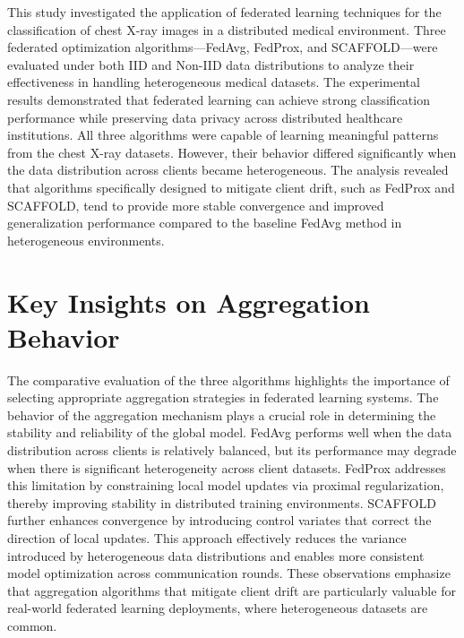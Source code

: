 \documentclass[12pt]{book}
\begin{document}
This study investigated the application of federated learning techniques for the classification of chest X-ray images in a distributed medical environment. Three federated optimization algorithms—FedAvg, FedProx, and SCAFFOLD—were evaluated under both IID and Non-IID data distributions to analyze their effectiveness in handling heterogeneous medical datasets.
The experimental results demonstrated that federated learning can achieve strong classification performance while preserving data privacy across distributed healthcare institutions. All three algorithms were capable of learning meaningful patterns from the chest X-ray datasets. However, their behavior differed significantly when the data distribution across clients became heterogeneous.
The analysis revealed that algorithms specifically designed to mitigate client drift, such as FedProx and SCAFFOLD, tend to provide more stable convergence and improved generalization performance compared to the baseline FedAvg method in heterogeneous environments.

\section{Key Insights on Aggregation Behavior}

The comparative evaluation of the three algorithms highlights the importance of selecting appropriate aggregation strategies in federated learning systems. The behavior of the aggregation mechanism plays a crucial role in determining the stability and reliability of the global model.
FedAvg performs well when the data distribution across clients is relatively balanced, but its performance may degrade when there is significant heterogeneity across client datasets. FedProx addresses this limitation by constraining local model updates via proximal regularization, thereby improving stability in distributed training environments.
SCAFFOLD further enhances convergence by introducing control variates that correct the direction of local updates. This approach effectively reduces the variance introduced by heterogeneous data distributions and enables more consistent model optimization across communication rounds.
These observations emphasize that aggregation algorithms that mitigate client drift are particularly valuable for real-world federated learning deployments, where heterogeneous datasets are common.
\end{document}
